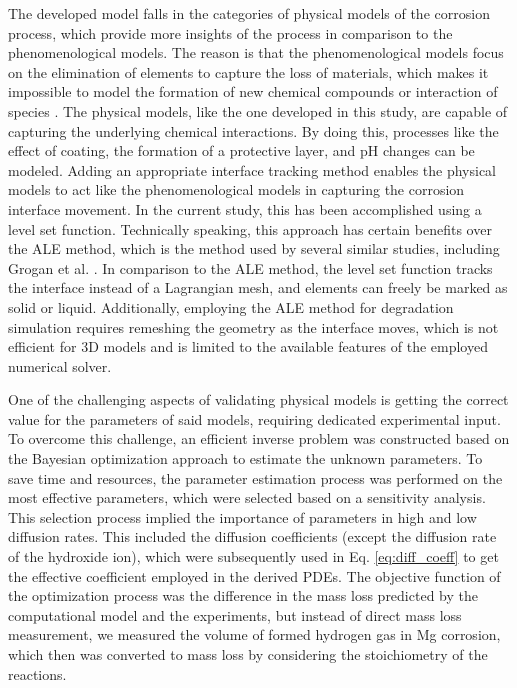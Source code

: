 The developed model falls in the categories of physical models of the corrosion process, which provide more insights of the process in comparison to the phenomenological models. The reason is that the phenomenological models focus on the elimination of elements to capture the loss of materials, which makes it impossible to model the formation of new chemical compounds or interaction of species \cite{Abdalla2020}. The physical models, like the one developed in this study, are capable of capturing the underlying chemical interactions. By doing this, processes like the effect of coating, the formation of a protective layer, and pH changes can be modeled. Adding an appropriate interface tracking method enables the physical models to act like the phenomenological models in capturing the corrosion interface movement. In the current study, this has been accomplished using a level set function. Technically speaking, this approach has certain benefits over the  \gls{ALE} method,  which is the method used by several similar studies, including Grogan et al. \cite{Grogan2014}. In comparison to the \gls{ALE} method, the level set function tracks the interface instead of a Lagrangian mesh, and elements can freely be marked as solid or liquid. Additionally, employing the \gls{ALE} method for degradation simulation requires remeshing the geometry as the interface moves, which is not efficient for 3D models and is limited to the available features of the employed numerical solver.

One of the challenging aspects of validating physical models is getting the correct value for the parameters of said models, requiring dedicated experimental input. To overcome this challenge, an efficient inverse problem was constructed based on the Bayesian optimization approach to estimate the unknown parameters. To save time and resources, the parameter estimation process was performed on the most effective parameters, which were selected based on a sensitivity analysis. This selection process implied the importance of parameters in high and low diffusion rates. This included the diffusion coefficients (except the diffusion rate of the hydroxide ion), which were subsequently used in Eq. \ref{eq:diff_coeff} to get the effective coefficient employed in the derived \gls{PDE}s. The objective function of the optimization process was the difference in the mass loss predicted by the computational model and the experiments, but instead of direct mass loss measurement, we measured the volume of formed hydrogen gas in Mg corrosion, which then was converted to mass loss by considering the stoichiometry of the reactions.

